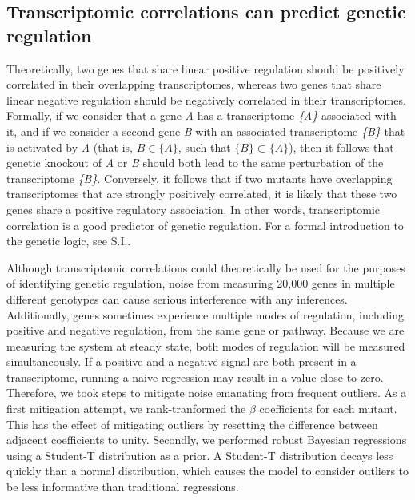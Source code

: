 \documentclass[9pt,twocolumn,twoside]{pnas-new}
\begin{document}
\subsection{Transcriptomic correlations can predict genetic regulation}
\label{sub:Transcriptomic genetic analyses}

Theoretically, two genes that share linear positive regulation should be positively correlated in their overlapping transcriptomes, whereas two genes that share linear negative regulation should be negatively correlated in their transcriptomes. Formally, if we consider that a gene \emph{A} has a transcriptome \emph{\{A\}} associated with it, and if we consider a second gene \emph{B} with an associated transcriptome \emph{\{B\}} that is activated by \emph{A} (that is, $B \in \{A\}$, such that $\{B\} \subset \{A\}$), then it follows that genetic knockout of \emph{A} or \emph{B} should both lead to the same perturbation of the transcriptome \emph{\{B\}}. Conversely, it follows that if two mutants have overlapping transcriptomes that are strongly positively correlated, it is likely that these two genes share a positive regulatory association. In other words, transcriptomic correlation is a good predictor of genetic regulation. For a formal introduction to the genetic logic, see S.I..

Although transcriptomic correlations could theoretically be used for the purposes of identifying genetic regulation, noise from measuring 20,000 genes in multiple different genotypes can cause serious interference with any inferences. Additionally, genes sometimes experience multiple modes of regulation, including positive and negative regulation, from the same gene or pathway. Because we are measuring the system at steady state, both modes of regulation will be measured simultaneously. If a positive and a negative signal are both present in a transcriptome, running a naive regression may result in a value close to zero.
Therefore, we took steps to mitigate noise emanating from frequent outliers. As a first mitigation attempt, we rank-tranformed the $\beta$ coefficients for each mutant. This has the effect of mitigating outliers by resetting the difference between adjacent coefficients to unity. Secondly, we performed robust Bayesian regressions using a Student-T distribution as a prior. A Student-T distribution decays less quickly than a normal distribution, which causes the model to consider outliers to be less informative than traditional regressions.
\end{document}
